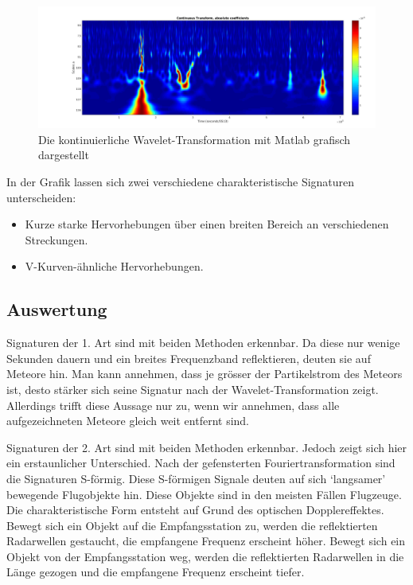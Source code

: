 \begin{refsection}
\begin{figure}[h!]
	\centering
	\includegraphics[width=\linewidth]{papers/meteor/images/signal_wscalo.png}
	\caption{Die kontinuierliche Wavelet-Transformation mit Matlab grafisch dargestellt}
	\label{fig:signalmitwscalo}
\end{figure}
In der Grafik lassen sich zwei verschiedene charakteristische Signaturen unterscheiden:
\begin{itemize}
	\item Kurze starke Hervorhebungen über einen breiten Bereich an verschiedenen Streckungen.
	\item V-Kurven-ähnliche  Hervorhebungen.
\end{itemize}

\newpage
\subsection{Auswertung}
Signaturen der 1. Art sind mit beiden Methoden erkennbar.
Da diese nur wenige Sekunden dauern und ein breites Frequenzband reflektieren, deuten sie auf Meteore hin.
Man kann annehmen, dass je grösser der Partikelstrom des Meteors ist, desto stärker sich seine Signatur nach der Wavelet-Transformation zeigt.
Allerdings trifft diese Aussage nur zu, wenn wir annehmen, dass alle aufgezeichneten Meteore gleich weit entfernt sind.

Signaturen der 2. Art sind mit beiden Methoden erkennbar.
Jedoch zeigt sich hier ein erstaunlicher Unterschied.
Nach der gefensterten Fouriertransformation sind die Signaturen S-förmig.
Diese S-förmigen Signale deuten auf sich `langsamer' bewegende Flugobjekte hin.
Diese Objekte sind in den meisten Fällen Flugzeuge.
Die charakteristische Form entsteht auf Grund des optischen Dopplereffektes. 
Bewegt sich ein Objekt auf die Empfangsstation zu, werden die reflektierten Radarwellen gestaucht, die empfangene Frequenz erscheint höher.
Bewegt sich ein Objekt von der Empfangsstation weg, werden die reflektierten Radarwellen in die Länge gezogen und die empfangene Frequenz erscheint tiefer.


\end{refsection}
